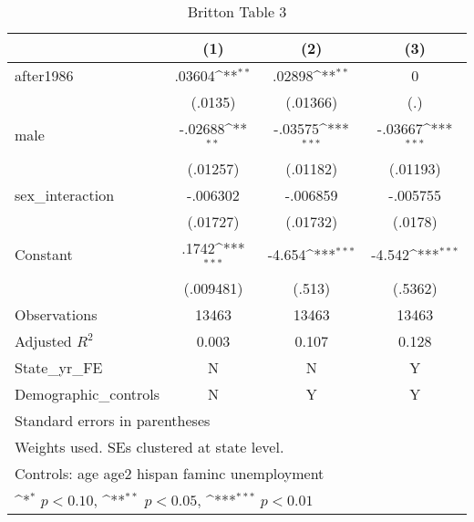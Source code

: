 \begin{table}[htbp]\centering
\def\sym#1{\ifmmode^{#1}\else\(^{#1}\)\fi}
\caption{Britton Table 3}
\begin{tabular}{l*{3}{c}}
\hline\hline
                    &\multicolumn{1}{c}{(1)}         &\multicolumn{1}{c}{(2)}         &\multicolumn{1}{c}{(3)}         \\
\hline
after1986           &      .03604\sym{**} &      .02898\sym{**} &           0         \\
                    &     (.0135)         &    (.01366)         &         (.)         \\
[1em]
male                &     -.02688\sym{**} &     -.03575\sym{***}&     -.03667\sym{***}\\
                    &    (.01257)         &    (.01182)         &    (.01193)         \\
[1em]
sex\_interaction     &    -.006302         &    -.006859         &    -.005755         \\
                    &    (.01727)         &    (.01732)         &     (.0178)         \\
[1em]
Constant            &       .1742\sym{***}&      -4.654\sym{***}&      -4.542\sym{***}\\
                    &   (.009481)         &      (.513)         &     (.5362)         \\
\hline
Observations        &       13463         &       13463         &       13463         \\
Adjusted \(R^{2}\)  &       0.003         &       0.107         &       0.128         \\
State\_yr\_FE         &           N         &           N         &           Y         \\
Demographic\_controls&           N         &           Y         &           Y         \\
\hline\hline
\multicolumn{4}{l}{\footnotesize Standard errors in parentheses}\\
\multicolumn{4}{l}{\footnotesize Weights used. SEs clustered at state level.}\\
\multicolumn{4}{l}{\footnotesize Controls: age age2 hispan faminc unemployment}\\
\multicolumn{4}{l}{\footnotesize \sym{*} \(p<0.10\), \sym{**} \(p<0.05\), \sym{***} \(p<0.01\)}\\
\end{tabular}
\end{table}
